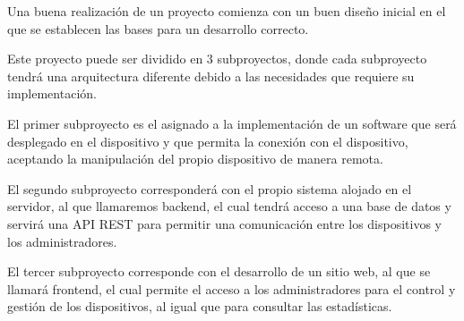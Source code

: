 Una buena realización de un proyecto comienza con un buen diseño inicial en el que se establecen las bases para un desarrollo correcto.

Este proyecto puede ser dividido en 3 subproyectos, donde cada subproyecto tendrá una arquitectura diferente debido a las necesidades que requiere su implementación.

El primer subproyecto es el asignado a la implementación de un software que será desplegado en el dispositivo y que permita la conexión con el dispositivo, aceptando la manipulación del propio dispositivo de manera remota.

El segundo subproyecto corresponderá con el propio sistema alojado en el servidor, al que llamaremos backend, el cual tendrá acceso a una base de datos y servirá una API REST para permitir una comunicación entre los dispositivos y los administradores.

El tercer subproyecto corresponde con el desarrollo de un sitio web, al que se llamará frontend, el cual permite el acceso a los administradores para el control y gestión de los dispositivos, al igual que para consultar las estadísticas.